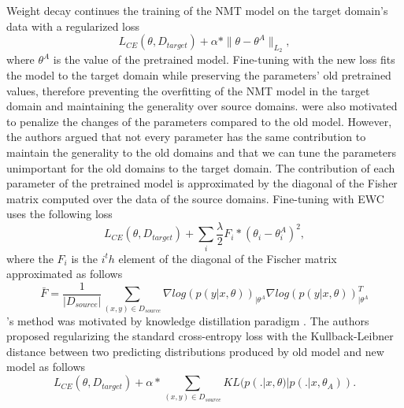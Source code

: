 Weight decay \citep{Miceli17regularization} continues the training of the NMT model on the target domain's data with a regularized loss 
\begin{equation}
L_{CE}(\theta,\mathit{D}_{target}) + \alpha * \parallel \theta - \theta^{A} \parallel_{L_2},
\end{equation}
where $\theta^{A}$ is the value of the pretrained model. Fine-tuning with the new loss fits the model to the target domain while preserving the parameters' old pretrained values, therefore preventing the overfitting of the NMT model in the target domain and maintaining the generality over source domains. \citet{Brian19overcoming, Kirk16overcoming, Saunders19domain} were also motivated to penalize the changes of the parameters compared to the old model. However, the authors argued that not every parameter has the same contribution to maintain the generality to the old domains and that we can tune the parameters unimportant for the old domains to the target domain. The contribution of each parameter of the pretrained model is approximated by the diagonal of the Fisher matrix computed over the data of the source domains. Fine-tuning with EWC uses the following loss
\begin{equation}
L_{CE}(\theta,\mathit{D}_{target}) + \sum_{i} \frac{\lambda}{2} F_i * (\theta_i - \theta_i^{A})^2,
\end{equation}
where the $F_i$ is the $i^th$ element of the diagonal of the Fischer matrix approximated as follows
\begin{equation}
\bar{F} = \frac{1}{|\mathit{D}_{source}|} \displaystyle{\mathop{\sum}_{(x,y)\in \mathit{D}_{source}}} \nabla log(p(y|x,\theta))_{| \theta^{A}} \nabla log(p(y|x,\theta))_{| \theta^{A}}^{T}
\end{equation}
\citet{Dakwle17fine}'s method was motivated by knowledge distillation paradigm \citep{Hinton15Distilling}. The authors proposed regularizing the standard cross-entropy loss with the Kullback-Leibner distance \citep{Kullback51On} between two predicting distributions produced by old model and new model as follows
\begin{equation}
L_{CE}(\theta,\mathit{D}_{target}) + \alpha * \displaystyle{\mathop{\sum}_{(x,y)\in \mathit{D}_{source}}} KL(p(.|x,\theta) | p(.|x,\theta_{A})).
\end{equation}

